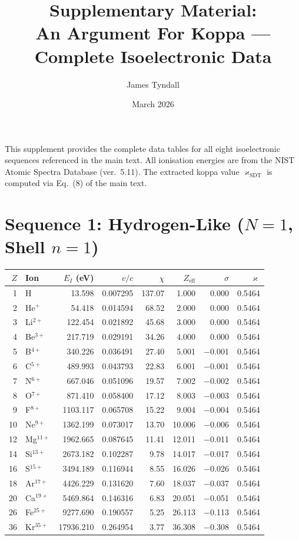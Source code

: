 \documentclass{article}
\title{Supplementary Material:\\
An Argument For Koppa --- Complete Isoelectronic Data}
\author{James Tyndall}
\date{March 2026}
\newcommand{\kop}{\varkappa}
\begin{document}
\maketitle

This supplement provides the complete data tables for all eight isoelectronic sequences referenced in the main text.  All ionisation energies are from the NIST Atomic Spectra Database (ver.\ 5.11).  The extracted koppa value $\kop_{\text{SDT}}$ is computed via Eq.~(8) of the main text.

\section{Sequence 1: Hydrogen-Like ($N = 1$, Shell $n = 1$)}

\begin{center}
\small
\begin{tabular}{rlrrrrrr}
\toprule
$Z$ & Ion & $E_I$ (eV) & $v/c$ & $\chi$ & $Z_{\text{eff}}$ & $\sigma$ & $\kop$ \\
\midrule
 1 & H          &    13.598 & 0.007295 & 137.07 &  1.000 &  0.000 & 0.5464 \\
 2 & He$^+$     &    54.418 & 0.014594 &  68.52 &  2.000 &  0.000 & 0.5464 \\
 3 & Li$^{2+}$  &   122.454 & 0.021892 &  45.68 &  3.000 &  0.000 & 0.5464 \\
 4 & Be$^{3+}$  &   217.719 & 0.029191 &  34.26 &  4.000 &  0.000 & 0.5464 \\
 5 & B$^{4+}$   &   340.226 & 0.036491 &  27.40 &  5.001 & $-$0.001 & 0.5464 \\
 6 & C$^{5+}$   &   489.993 & 0.043793 &  22.83 &  6.001 & $-$0.001 & 0.5464 \\
 7 & N$^{6+}$   &   667.046 & 0.051096 &  19.57 &  7.002 & $-$0.002 & 0.5464 \\
 8 & O$^{7+}$   &   871.410 & 0.058400 &  17.12 &  8.003 & $-$0.003 & 0.5464 \\
 9 & F$^{8+}$   &  1103.117 & 0.065708 &  15.22 &  9.004 & $-$0.004 & 0.5464 \\
10 & Ne$^{9+}$  &  1362.199 & 0.073017 &  13.70 & 10.006 & $-$0.006 & 0.5464 \\
12 & Mg$^{11+}$ &  1962.665 & 0.087645 &  11.41 & 12.011 & $-$0.011 & 0.5464 \\
14 & Si$^{13+}$ &  2673.182 & 0.102287 &   9.78 & 14.017 & $-$0.017 & 0.5464 \\
16 & S$^{15+}$  &  3494.189 & 0.116944 &   8.55 & 16.026 & $-$0.026 & 0.5464 \\
18 & Ar$^{17+}$ &  4426.229 & 0.131620 &   7.60 & 18.037 & $-$0.037 & 0.5464 \\
20 & Ca$^{19+}$ &  5469.864 & 0.146316 &   6.83 & 20.051 & $-$0.051 & 0.5464 \\
26 & Fe$^{25+}$ &  9277.690 & 0.190557 &   5.25 & 26.113 & $-$0.113 & 0.5464 \\
36 & Kr$^{35+}$ & 17936.210 & 0.264954 &   3.77 & 36.308 & $-$0.308 & 0.5464 \\
\bottomrule
\end{tabular}
\end{center}
\end{document}
